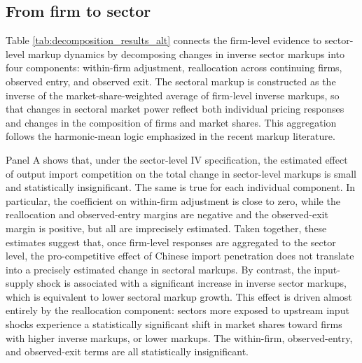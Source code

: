\documentclass[12pt]{article}
\begin{document}
\subsection{From firm to sector}

Table \ref{tab:decomposition_results_alt} connects the firm-level evidence to sector-level markup dynamics by decomposing changes in inverse sector markups into four components: within-firm adjustment, reallocation across continuing firms, observed entry, and observed exit. The sectoral markup is constructed as the inverse of the market-share-weighted average of firm-level inverse markups, so that changes in sectoral market power reflect both individual pricing responses and changes in the composition of firms and market shares. This aggregation follows the harmonic-mean logic emphasized in the recent markup literature.

Panel A shows that, under the sector-level IV specification, the estimated effect of output import competition on the total change in sector-level markups is small and statistically insignificant. The same is true for each individual component. In particular, the coefficient on within-firm adjustment is close to zero, while the reallocation and observed-entry margins are negative and the observed-exit margin is positive, but all are imprecisely estimated. Taken together, these estimates suggest that, once firm-level responses are aggregated to the sector level, the pro-competitive effect of Chinese import penetration does not translate into a precisely estimated change in sectoral markups. By contrast, the input-supply shock is associated with a significant increase in inverse sector markups, which is equivalent to lower sectoral markup growth. This effect is driven almost entirely by the reallocation component: sectors more exposed to upstream input shocks experience a statistically significant shift in market shares toward firms with higher inverse markups, or lower markups. The within-firm, observed-entry, and observed-exit terms are all statistically insignificant.
\end{document}
